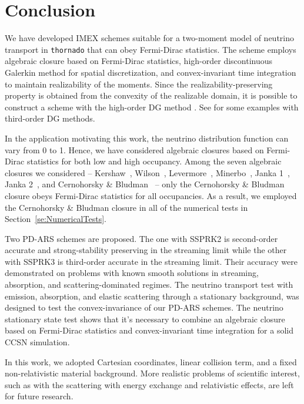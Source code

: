 \section{Conclusion}\label{se:Conclusion}

We have developed IMEX schemes suitable for a two-moment model of neutrino transport in \texttt{thornado} that can obey Fermi-Dirac statistics.  
The scheme employs algebraic closure based on Fermi-Dirac statistics, high-order discontinuous Galerkin method for spatial discretization, and convex-invariant time integration to maintain realizability of the moments.  
Since the realizability-preserving property is obtained from the convexity of the realizable domain, it is possible to construct a scheme with the high-order DG method .  
See \cite{chu_etal_2018} for some examples with third-order DG methods.  

In the application motivating this work, the neutrino distribution function can vary from 0 to 1.  
Hence, we have considered algebraic closures based on Fermi-Dirac statistics for both low and high occupancy.  
Among the seven algebraic closures we considered -- Kershaw~\cite{kershaw_1976}, Wilson~\cite{wilson_1975,leblancWilson_1970}, Levermore~\cite{levermore_1984}, Minerbo~\cite{minerbo_1978}, Janka 1~\cite{janka_1991}, Janka 2~\cite{janka_1992}, and Cernohorsky \& Bludman~\cite{cernohorskyBludman_1994} -- only the Cernohorsky \& Bludman closure obeys Fermi-Dirac statistics for all occupancies.  
As a result, we employed the Cernohorsky \& Bludman closure in all of the numerical tests in Section~\ref{se:NumericalTests}.  

Two PD-ARS schemes are proposed.  
The one with SSPRK2 is second-order accurate and strong-stability preserving in the streaming limit while the other with SSPRK3 is third-order accurate in the streaming limit.  
Their accuracy were demonstrated on problems with known smooth solutions in streaming, absorption, and scattering-dominated regimes.
The neutrino transport test with emission, absorption, and elastic scattering through a stationary background, was designed to test the convex-invariance of our PD-ARS schemes.
The neutrino stationary state test shows that it's necessary to combine an algebraic closure based on Fermi-Dirac statistics and convex-invariant time integration for a solid CCSN simulation.  

In this work, we adopted Cartesian coordinates, linear collision term, and a fixed non-relativistic material background.
More realistic problems of scientific interest, such as with the scattering with energy exchange and relativistic effects, are left for future research.